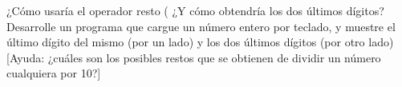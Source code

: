 ¿Cómo usaría el operador resto (%
¿Y cómo obtendría los dos últimos dígitos? Desarrolle un programa que cargue un número entero por teclado,
y muestre el último dígito del mismo (por un lado) y los dos últimos dígitos (por otro lado) [Ayuda: ¿cuáles
son los posibles restos que se obtienen de dividir un número cualquiera por 10?]
